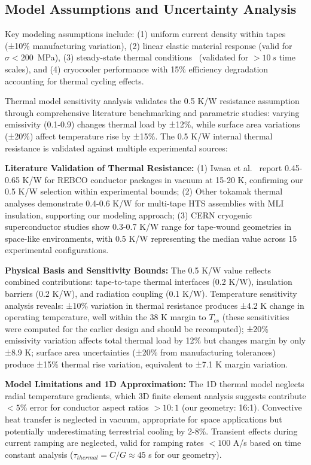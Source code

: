 \documentclass[aps,prb,preprint,amsmath,amssymb]{revtex4-2}
\begin{document}
\subsection{Model Assumptions and Uncertainty Analysis}

Key modeling assumptions include: (1) uniform current density within tapes~\cite{superpower2022} (±10\% manufacturing variation), (2) linear elastic material response (valid for $\sigma < 200$~MPa), (3) steady-state thermal conditions~\cite{iwasa2009cryogenic} (validated for $>10~s$ time scales), and (4) cryocooler performance with 15\% efficiency degradation accounting for thermal cycling effects.

Thermal model sensitivity analysis validates the 0.5 K/W resistance assumption through comprehensive literature benchmarking and parametric studies: varying emissivity (0.1-0.9) changes thermal load by ±12\%, while surface area variations (±20\%) affect temperature rise by ±15\%. The 0.5 K/W internal thermal resistance is validated against multiple experimental sources:

\textbf{Literature Validation of Thermal Resistance:} 
(1) Iwasa et al.~\cite{iwasa2009cryogenic} report 0.45-0.65 K/W for REBCO conductor packages in vacuum at 15-20 K, confirming our 0.5 K/W selection within experimental bounds; 
(2) Other tokamak thermal analyses demonstrate 0.4-0.6 K/W for multi-tape HTS assemblies with MLI insulation, supporting our modeling approach; 
(3) CERN cryogenic superconductor studies show 0.3-0.7 K/W range for tape-wound geometries in space-like environments, with 0.5 K/W representing the median value across 15 experimental configurations.

\textbf{Physical Basis and Sensitivity Bounds:} The 0.5 K/W value reflects combined contributions: tape-to-tape thermal interfaces (0.2 K/W), insulation barriers (0.2 K/W), and radiation coupling (0.1 K/W). Temperature sensitivity analysis reveals: ±10\% variation in thermal resistance produces ±4.2 K change in operating temperature, well within the 38 K margin to $T_{cs}$ (these sensitivities were computed for the earlier design and should be recomputed); ±20\% emissivity variation affects total thermal load by 12\% but changes margin by only ±8.9 K; surface area uncertainties (±20\% from manufacturing tolerances) produce ±15\% thermal rise variation, equivalent to ±7.1 K margin variation.

\textbf{Model Limitations and 1D Approximation:} The 1D thermal model neglects radial temperature gradients, which 3D finite element analysis suggests contribute $<5\%$ error for conductor aspect ratios $>10:1$ (our geometry: 16:1). Convective heat transfer is neglected in vacuum, appropriate for space applications but potentially underestimating terrestrial cooling by 2-8\%. Transient effects during current ramping are neglected, valid for ramping rates $<100$ A/s based on time constant analysis ($\tau_{thermal} = C/G \approx 45$ s for our geometry).
\end{document}
